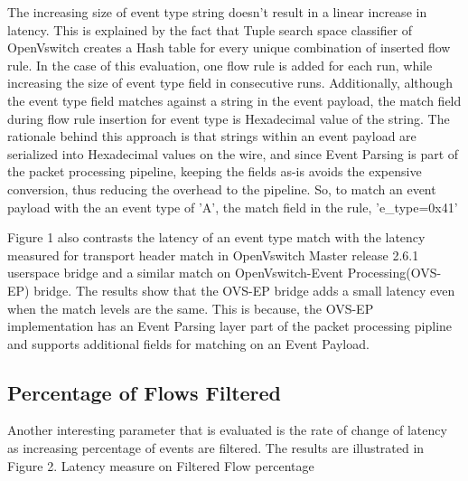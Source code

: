 The increasing size of event type string doesn't result in a linear increase in latency. This is explained by the fact that Tuple search space classifier of OpenVswitch creates a Hash table for every unique combination of inserted flow rule. In the case of this evaluation, one flow rule is added for each run, while increasing the size of event type field in consecutive runs. Additionally, although the event type field matches against a string in the event payload, the match field during flow rule insertion for event type is Hexadecimal value of the string. The rationale behind this approach is that strings within an event payload are serialized into Hexadecimal values on the wire, and since Event Parsing is part of the packet processing pipeline, keeping the fields as-is avoids the expensive conversion, thus reducing the overhead to the pipeline. So, to match an event payload with the an event type of 'A', the match field in the rule, 'e_type=0x41'

Figure 1 also contrasts the latency of an event type match with the latency measured for transport header match in OpenVswitch Master release 2.6.1 userspace bridge and a similar match on OpenVswitch-Event Processing(OVS-EP) bridge. The results show that the OVS-EP bridge adds a small latency even when the match levels are the same. This is because, the OVS-EP implementation has an Event Parsing layer part of the packet processing pipline and supports additional fields for matching on an Event Payload.

\subsection{Percentage of Flows Filtered}
Another interesting parameter that is evaluated is the rate of change of latency as increasing percentage of events are filtered. The results are illustrated in Figure 2.\newline
\newline
\newline
\newline
\newline
\newline\newline
Latency measure on Filtered Flow percentage
\newline
\newline
\newline
\newline\newline
\newline
\newline

